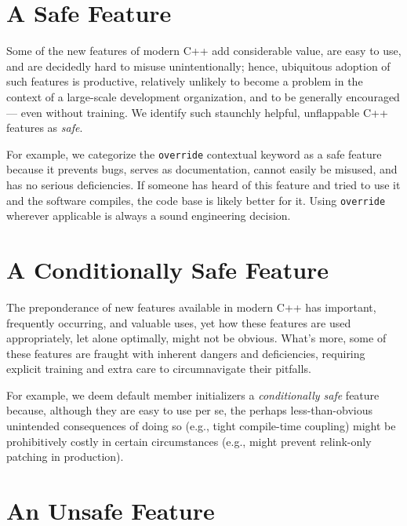 \section[A {\sffamily\itshape Safe} Feature]{A {\sfbsectionitalRomeo Safe} Feature}

Some of the new features of modern C++ add considerable value, are easy to use, and are decidedly hard to misuse unintentionally; hence, ubiquitous adoption of such features is productive, relatively unlikely to become a problem in the context of 
 a large-scale development organization, and to be generally encouraged --- even without training. We identify such staunchly helpful, unflappable C++ features as \textit{safe}.%

For example, we categorize the \texttt{override} contextual keyword as a safe feature because it prevents bugs, serves as documentation, cannot easily be misused, and has no serious deficiencies. If someone has heard of this feature and tried to use it and the software compiles, the code base is likely better for it. Using \texttt{override} wherever applicable is always a sound engineering decision.

\section[A {\sffamily\itshape Conditionally Safe} Feature]{A {\sfbsectionitalRomeo Conditionally Safe} Feature}

The preponderance of new features available in modern C++ has important, frequently occurring, and valuable uses, yet how these features are used appropriately, let alone optimally, might not be obvious. What’s more, some of these features are fraught with inherent dangers and deficiencies, requiring explicit training and extra care to circumnavigate their pitfalls.

For example, we deem default member initializers a \textit{conditionally safe} feature because, although they are easy to use per se, the perhaps less-than-obvious unintended consequences of doing so (e.g., tight compile-time coupling) might be prohibitively costly in certain circumstances (e.g., might prevent relink-only patching in production).

\section[An {\sffamily\itshape Unsafe} Feature]{An {\sfbsectionitalRomeo Unsafe} Feature}

